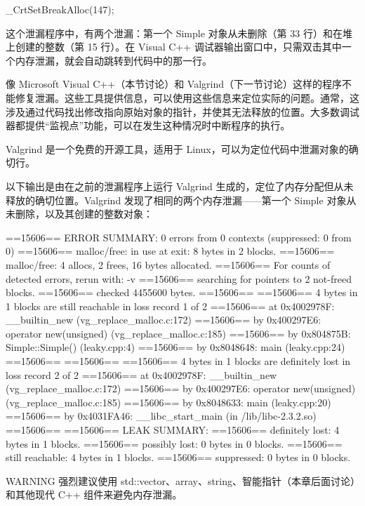 \begin{cpp}
_CrtSetBreakAlloc(147);
\end{cpp}

这个泄漏程序中，有两个泄漏：第一个 Simple 对象从未删除（第 33 行）和在堆上创建的整数（第 15 行）。在 Visual C++ 调试器输出窗口中，只需双击其中一个内存泄漏，就会自动跳转到代码中的那一行。

像 Microsoft Visual C++（本节讨论）和 Valgrind（下一节讨论）这样的程序不能修复泄漏。这些工具提供信息，可以使用这些信息来定位实际的问题。通常，这涉及通过代码找出修改指向原始对象的指针，并使其无法释放的位置。大多数调试器都提供“监视点”功能，可以在发生这种情况时中断程序的执行。


Valgrind 是一个免费的开源工具，适用于 Linux，可以为定位代码中泄漏对象的确切行。

以下输出是由在之前的泄漏程序上运行 Valgrind 生成的，定位了内存分配但从未释放的确切位置。Valgrind 发现了相同的两个内存泄漏——第一个 Simple 对象从未删除，以及其创建的整数对象：

\begin{shell}
==15606== ERROR SUMMARY: 0 errors from 0 contexts (suppressed: 0 from 0)
==15606== malloc/free: in use at exit: 8 bytes in 2 blocks.
==15606== malloc/free: 4 allocs, 2 frees, 16 bytes allocated.
==15606== For counts of detected errors, rerun with: -v
==15606== searching for pointers to 2 not-freed blocks.
==15606== checked 4455600 bytes.
==15606==
==15606== 4 bytes in 1 blocks are still reachable in loss record 1 of 2
==15606==    at 0x4002978F: __builtin_new (vg_replace_malloc.c:172)
==15606==    by 0x400297E6: operator new(unsigned) (vg_replace_malloc.c:185)
==15606==    by 0x804875B: Simple::Simple() (leaky.cpp:4)
==15606==    by 0x8048648: main (leaky.cpp:24)
==15606==
==15606==
==15606== 4 bytes in 1 blocks are definitely lost in loss record 2 of 2
==15606==    at 0x4002978F: __builtin_new (vg_replace_malloc.c:172)
==15606==    by 0x400297E6: operator new(unsigned) (vg_replace_malloc.c:185)
==15606==    by 0x8048633: main (leaky.cpp:20)
==15606==    by 0x4031FA46: __libc_start_main (in /lib/libc-2.3.2.so)
==15606==
==15606== LEAK SUMMARY:
==15606==     definitely lost: 4 bytes in 1 blocks.
==15606==     possibly lost:   0 bytes in 0 blocks.
==15606==     still reachable: 4 bytes in 1 blocks.
==15606==          suppressed: 0 bytes in 0 blocks.
\end{shell}

\begin{myWarning}{WARNING}
强烈建议使用 std::vector、array、string、智能指针（本章后面讨论）和其他现代 C++ 组件来避免内存泄漏。
\end{myWarning}

